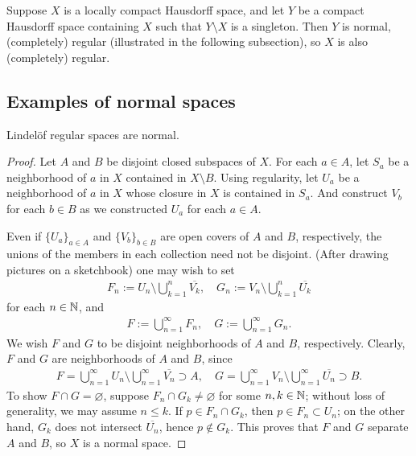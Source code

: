 \begin{exmp}
    Suppose $X$ is a locally compact Hausdorff space, and let $Y$ be a compact Hausdorff space containing $X$ such that $Y\setminus X$ is a singleton.
    Then $Y$ is normal, (completely) regular (illustrated in the following subsection), so $X$ is also (completely) regular.
\end{exmp}

\subsection{Examples of normal spaces}
\begin{thm}
    Lindel\"{o}f regular spaces are normal.
\end{thm}
\begin{proof}
    Let $A$ and $B$ be disjoint closed subspaces of $X$.
    For each $a\in A$, let $S_a$ be a neighborhood of $a$ in $X$ contained in $X\setminus B$.
    Using regularity, let $U_a$ be a neighborhood of $a$ in $X$ whose closure in $X$ is contained in $S_a$.
    And construct $V_b$ for each $b\in B$ as we constructed $U_a$ for each $a\in A$.

    Even if $\{U_a\}_{a\in A}$ and $\{V_b\}_{b\in B}$ are open covers of $A$ and $B$, respectively, the unions of the members in each collection need not be disjoint.
    (After drawing pictures on a sketchbook) one may wish to set
    \begin{align*}
        F_n:=U_n\setminus\bigcup_{k=1}^n\overline{V_k},\quad G_n:=V_n\setminus\bigcup_{k=1}^n\overline{U_k}
    \end{align*}
    for each $n\in{\mathbb{N}}$, and
    \begin{align*}
        F:=\bigcup_{n=1}^\infty F_n,\quad G:=\bigcup_{n=1}^\infty G_n.
    \end{align*}
    We wish $F$ and $G$ to be disjoint neighborhoods of $A$ and $B$, respectively.
    Clearly, $F$ and $G$ are neighborhoods of $A$ and $B$, since
    \begin{align*}
        F=\bigcup_{n=1}^\infty U_n\setminus\bigcup_{n=1}^\infty\overline{V_n}\supset A,\quad G=\bigcup_{n=1}^\infty V_n\setminus\bigcup_{n=1}^\infty\overline{U_n}\supset B.
    \end{align*}
    To show $F\cap G=\varnothing$, suppose $F_n\cap G_k\neq\varnothing$ for some $n, k\in{\mathbb{N}}$; without loss of generality, we may assume $n\leq k$.
    If $p\in F_n\cap G_k$, then $p\in F_n\subset U_n$; on the other hand, $G_k$ does not intersect $\overline{U_n}$, hence $p\notin G_k$.
    This proves that $F$ and $G$ separate $A$ and $B$, so $X$ is a normal space.
\end{proof}

